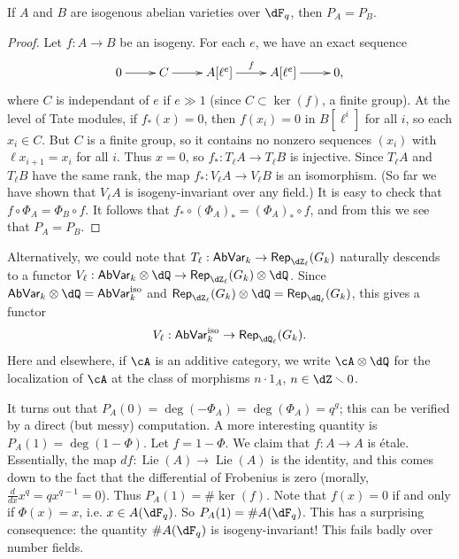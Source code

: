 \begin{theorem}
If $A$ and $B$ are isogenous abelian varieties over $\dF_q$, then 
$P_A=P_B$.
\end{theorem}
\begin{proof}
Let $f:A\to B$ be an isogeny. For each $e$, we have an exact sequence 
\[\xymatrix{
  0 \ar[r] 
    & C \ar[r] 
    & A[\ell^e] \ar[r]^-f 
    & A[\ell^e] \ar[r]
    & 0\text{,}
}\]
where $C$ is independant of $e$ if $e\gg 1$ (since $C\subset \ker(f)$, a finite 
group). At the level of Tate modules, if $f_\ast(x)=0$, then 
$f(x_i)=0$ in $B[\ell^i]$ for all $i$, so each $x_i\in C$. But $C$ is a finite 
group, so it contains no nonzero sequences $(x_i)$ with $\ell x_{i+1}=x_i$ for 
all $i$. Thus $x=0$, so $f_\ast:T_\ell A\to T_\ell B$ is injective. Since 
$T_\ell A$ and $T_\ell B$ have the same rank, the map 
$f_\ast:V_\ell A\to V_\ell B$ is an isomorphism. (So far we have shown that 
$V_\ell A$ is isogeny-invariant over any field.) It is easy to check that 
$f\circ \Phi_A=\Phi_B\circ f$. It follows that 
$f_\ast\circ (\Phi_A)_\ast = (\Phi_A)_\ast \circ f$, and from this we see that 
$P_A=P_B$. 
\end{proof}

Alternatively, we could note that 
$T_\ell:\mathsf{AbVar}_k\to \mathsf{Rep}_{\dZ_\ell}(G_k)$ naturally descends to 
a functor 
$V_\ell:\mathsf{AbVar}_k\otimes\dQ\to \mathsf{Rep}_{\dZ_\ell}(G_k)\otimes\dQ$. 
Since $\mathsf{AbVar}_k\otimes\dQ=\mathsf{AbVar}_k^\text{iso}$ and 
$\mathsf{Rep}_{\dZ_\ell}(G_k)\otimes\dQ=\mathsf{Rep}_{\dQ_\ell}(G_k)$, this 
gives a functor 
\[
  V_\ell:\mathsf{AbVar}_k^\text{iso} \to \mathsf{Rep}_{\dQ_\ell}(G_k) \text{.}
\]
Here and elsewhere, if $\cA$ is an additive category, we write 
$\cA\otimes\dQ$ for the localization of $\cA$ at the class of morphisms 
$n\cdot 1_A$, $n\in \dZ\smallsetminus 0$.

It turns out that $P_A(0)=\deg(-\Phi_A)=\deg(\Phi_A)=q^g$; this can be verified 
by a direct (but messy) computation. A more interesting quantity is 
$P_A(1)=\deg(1-\Phi)$. Let $f=1-\Phi$. We claim that $f:A\to A$ is \'etale. 
Essentially, the map $d f:\operatorname{Lie}(A) \to \operatorname{Lie}(A)$ is 
the identity, and this comes down to the fact that the differential of 
Frobenius is zero (morally, $\frac{d}{dx}x^q=q x^{q-1}=0$). Thus 
$P_A(1)=\# \ker(f)$. Note that $f(x)=0$ if and only if $\Phi(x)=x$, i.e. 
$x\in A(\dF_q)$. So $P_A(1)=\#A(\dF_q)$. This has a surprising consequence: the 
quantity $\# A(\dF_q)$ is isogeny-invariant! This fails badly over number 
fields. 

